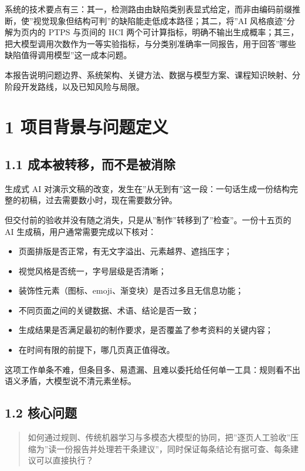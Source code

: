 \documentclass[
  11pt,
]{article}
\providecommand{\tightlist}{%
  \setlength{\itemsep}{0pt}\setlength{\parskip}{0pt}}
\begin{document}
系统的技术要点有三：其一，检测路由由缺陷类别表显式给定，而非由编码前缀推断，使''视觉现象但结构可判''的缺陷能走低成本路径；其二，将''AI
风格痕迹''分解为页内的 PTPS 与页间的 HCI
两个可计算指标，明确不输出生成概率；其三，把大模型调用次数作为一等实验指标，与分类别准确率一同报告，用于回答''哪些缺陷值得调用模型''这一成本问题。

本报告说明问题边界、系统架构、关键方法、数据与模型方案、课程知识映射、分阶段开发路线，以及已知风险与局限。

\section{1
项目背景与问题定义}\label{ux9879ux76eeux80ccux666fux4e0eux95eeux9898ux5b9aux4e49}

\subsection{1.1
成本被转移，而不是被消除}\label{ux6210ux672cux88abux8f6cux79fbux800cux4e0dux662fux88abux6d88ux9664}

生成式 AI
对演示文稿的改变，发生在''从无到有''这一段：一句话生成一份结构完整的初稿，过去需要数小时，现在需要数分钟。

但交付前的验收并没有随之消失，只是从''制作''转移到了''检查''。一份十五页的
AI 生成稿，用户通常需要完成以下核对：

\begin{itemize}
\tightlist
\item
  页面排版是否正常，有无文字溢出、元素越界、遮挡压字；
\item
  视觉风格是否统一，字号层级是否清晰；
\item
  装饰性元素（图标、emoji、渐变块）是否过多且无信息功能；
\item
  不同页面之间的关键数据、术语、结论是否一致；
\item
  生成结果是否满足最初的制作要求，是否覆盖了参考资料的关键内容；
\item
  在时间有限的前提下，哪几页真正值得改。
\end{itemize}

这项工作单条不难，但条目多、易遗漏、且难以委托给任何单一工具：规则看不出语义矛盾，大模型说不清元素坐标。

\subsection{1.2 核心问题}\label{ux6838ux5fc3ux95eeux9898}

\begin{quote}
如何通过规则、传统机器学习与多模态大模型的协同，把''逐页人工验收''压缩为''读一份报告并处理若干条建议''，同时保证每条结论有据可查、每条建议可以直接执行？
\end{quote}
\end{document}
